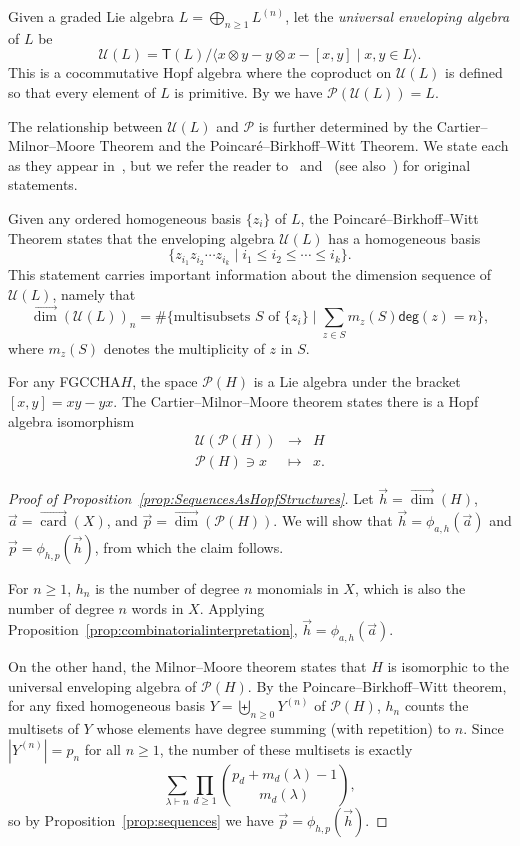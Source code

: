 \documentclass[11pt]{amsart}
\theoremstyle{definition}
\numberwithin{equation}{section}
\newcommand{\FGCCHA}{\textsf{FGCCHA}\xspace}
\newcommand{\vecdim}{\overrightarrow{\dim}}
\newcommand{\veccard}{\overrightarrow{\operatorname{card}}}
\begin{document}
Given a graded Lie algebra $L = \bigoplus_{n \ge 1} L^{(n)}$, let the \emph{universal enveloping algebra} of $L$ be
\[
\mathcal{U}(L) = \mathsf{T}(L) \big/ \big\langle x\otimes y - y \otimes x - [x, y] \;|\; \text{$x, y \in L$} \big\rangle.
\]
This is a cocommutative Hopf algebra where the coproduct on $\mathcal{U}(L)$ is defined so that every element of $L$ is primitive.  By \cite[Theorem 1.4]{Reutenauer-FreeLieAlgebras} we have $\mathcal{P}(\mathcal{U}(L))=L$.  

The relationship between $\mathcal{U}(L)$ and $\mathcal{P}$ is further determined by the Cartier--Milnor--Moore Theorem and the Poincar\'{e}--Birkhoff--Witt Theorem.  We state each as they appear in~\cite[Theorem 4.1.3]{L08}, but we refer the reader to~\cite[Theorem 5.18]{MM65} and~\cite{Cartier57} (see also~\cite[Section 3.8]{Cartier2007}) for original statements.

Given any ordered homogeneous basis $\{z_i\}$ of $L$, the Poincar\'{e}--Birkhoff--Witt Theorem
states that the enveloping algebra $\mathcal{U}(L)$ has a homogeneous basis
\[
\{ z_{i_1}z_{i_2}\cdots z_{i_k} \;|\; i_1 \leq i_2 \leq \cdots \leq i_k\}.
\]
This statement carries important information about the dimension sequence of $\mathcal{U}(L)$, namely that 
\[
\vecdim(\mathcal{U}(L))_{n}= \#\{\text{multisubsets $S$ of $\{z_{i}\}$} \;|\; \sum_{z \in S} m_{z}(S) \mathsf{deg}(z) = n\},
\]
where $m_{z}(S)$ denotes the multiplicity of $z$ in $S$.

For any \FGCCHA $H$, the space $\mathcal{P}(H)$ is a Lie algebra under the bracket $[x, y] = xy - yx$.  
The Cartier--Milnor--Moore theorem states there is a Hopf algebra isomorphism
\[
\begin{array}{rcl}
\mathcal{U}(\mathcal{P}(H)) &\to& H \\
\mathcal{P}(H) \ni x & \mapsto&  x.
\end{array}
\]

\begin{proof}[Proof of Proposition~\ref{prop:SequencesAsHopfStructures}]
Let $\vec{h} = \vecdim(H)$, $\vec{a} = \veccard(X)$, and $\vec{p} = \vecdim(\mathcal{P}(H))$.  We will show that $\vec{h} = \phi_{a, h}(\vec{a})$ and $\vec{p} = \phi_{h, p}(\vec{h})$, from which the claim follows.  

For $n \ge 1$, $h_{n}$ is the number of degree $n$ monomials in $X$, which is also the number of degree $n$ words in $X$.  
Applying Proposition~\ref{prop:combinatorialinterpretation}, $\vec{h} = \phi_{a, h}(\vec{a})$.

On the other hand, the Milnor--Moore theorem states that $H$ is
isomorphic to the universal enveloping algebra of $\mathcal{P}(H)$.
By the Poincare--Birkhoff--Witt theorem, for any fixed homogeneous basis
$Y = \biguplus_{n \ge 0} Y^{(n)}$ of $\mathcal{P}(H)$, $h_{n}$ counts
the multisets of $Y$ whose elements have degree summing (with repetition)
to $n$.  Since $|Y^{(n)}| = p_{n}$ for all $n \ge 1$, the number of these
multisets is exactly
\[
\sum_{\lambda \vdash n} \prod_{d \geq 1} \binom{p_d + m_d(\lambda) -1}{m_d(\lambda)},
\]
so by Proposition~\ref{prop:sequences} we have $\vec{p} = \phi_{h, p}(\vec{h})$.
\end{proof}
\end{document}
